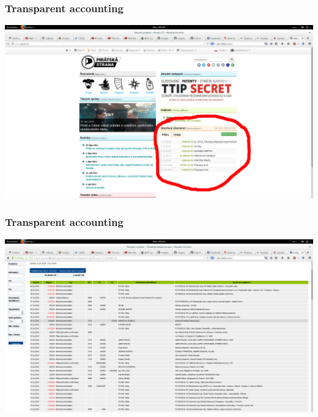 \begin{frame}
	\frametitle{Transparent accounting}
	\includegraphics[scale=0.16]{piraticz.png}
\end{frame}
\begin{frame}
	\frametitle{Transparent accounting}
	\includegraphics[scale=0.16]{fiocz.png}
\end{frame}
